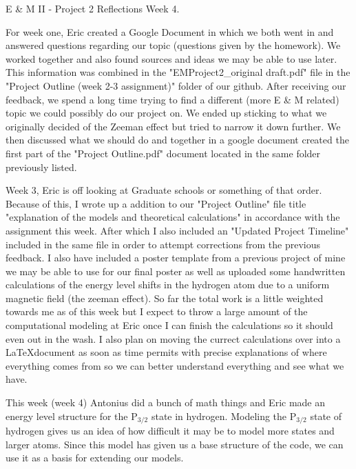 \documentclass[11pt]{article}
\begin{document}
 

\begin{center}
	{\Large E \& M II - Project 2 Reflections Week 4.}
\end{center}

For week one, Eric created a Google Document in which we both went in and answered questions regarding our topic (questions given by the homework). We worked together and also found sources and ideas we may be able to use later. This information was combined in the "EMProject2\_original draft.pdf" file in the "Project Outline (week 2-3 assignment)" folder of our github. After receiving our feedback, we spend a long time trying to find a different (more E \& M related) topic we could possibly do our project on. We ended up sticking to what we originally decided of the Zeeman effect but tried to narrow it down further. We then discussed what we should do and together in a google document created the first part of the "Project Outline.pdf" document located in the same folder previously listed. 

Week 3, Eric is off looking at Graduate schools or something of that order. Because of this, I wrote up a addition to our "Project Outline" file title "explanation of the models and theoretical calculations" in accordance with the assignment this week. After which I also included an "Updated Project Timeline" included in the same file in order to attempt corrections from the previous feedback. I also have included a poster template from a previous project of mine we may be able to use for our final poster as well as uploaded some handwritten calculations of the energy level shifts in the hydrogen atom due to a uniform magnetic field (the zeeman effect). So far the total work is a little weighted towards me as of this week but I expect to throw a large amount of the computational modeling at Eric once I can finish the calculations so it should even out in the wash. I also plan on moving the currect calculations over into a \LaTeX  document as soon as time permits with precise explanations of where everything comes from so we can better understand everything and see what we have.

This week (week 4) Antonius did a bunch of math things and Eric made an energy level structure for the P$_{3/2}$ state in hydrogen.  Modeling the P$_{3/2}$ state of hydrogen gives us an idea of how difficult it may be to model more states and larger atoms.  Since this model has given us a base structure of the code, we can use it as a basis for extending our models.
\end{document}
